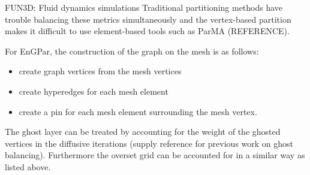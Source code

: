\documentclass{beamer}
\begin{document}
\begin{textblock}{15.6}
\begin{textblock}{5}
\begin{block}{\centering FUN3D: Fluid dynamics simulations}
      Traditional partitioning methods have trouble balancing these metrics simultaneously and the vertex-based partition makes it difficult to use element-based tools such as ParMA (REFERENCE).


      For EnGPar, the construction of the graph on the mesh is as follows:
      \begin{itemize}
      \item create graph vertices from the mesh vertices
      \item create hyperedges for each mesh element
      \item create a pin for each mesh element surrounding the mesh vertex.
      \end{itemize}

      The ghost layer can be treated by accounting for the weight of the ghosted vertices in the diffusive iterations (supply reference for previous work on ghost balancing). Furthermore the overset grid can be accounted for in a similar way as listed above.

      
    \end{block}
  \end{textblock}
\end{textblock}
\end{document}
